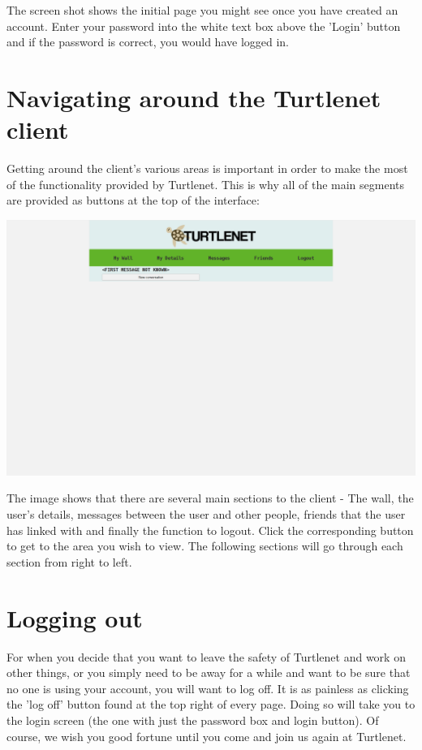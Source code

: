 The screen shot shows the initial page you might see once you have created an
account. Enter your password into the white text box above the 'Login' button
and if the password is correct, you would have logged in.

\pagebreak
\section{Navigating around the Turtlenet client}
Getting around the client's various areas is important in order to make the most
of the functionality provided by Turtlenet. This is why all of the main
segments are provided as buttons at the top of the interface:

\includegraphics[scale=0.2]{screenshots/Screenshot from 2014-04-29 22-31-38}

The image shows that there are several main sections to the client - The wall,
the user's details, messages between the user and other people, friends that the
user has linked with and finally the function to logout. Click the
corresponding button to get to the area you wish to view. The following
sections will go through each section from right to left.

\section{Logging out}
For when you decide that you want to leave the safety of Turtlenet and work on
other things, or you simply need to be away for a while and want to be sure that
no one is using your account, you will want to log off. It is as painless as
clicking the 'log off' button found at the top right of every page. Doing so
will take you to the login screen (the one with just the password box and login
button). Of course, we wish you good fortune until you come and join us again
at Turtlenet.

